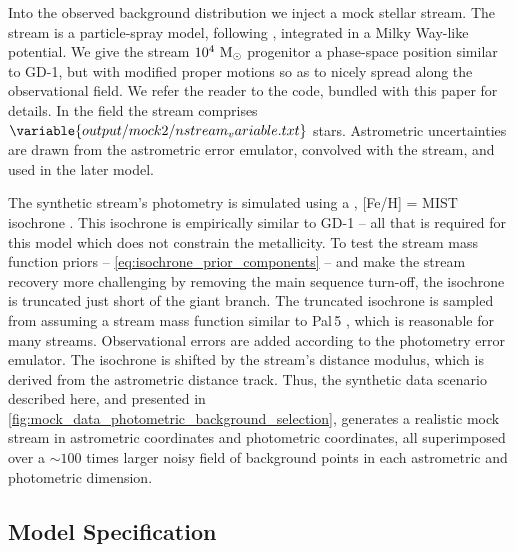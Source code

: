 \documentclass[twocolumn, linenumbers]{aastex631}
\newcommand{\stream}[1]{#1}
\begin{document}
        Into the observed background distribution we inject a mock stellar stream. The stream is a particle-spray model, following \cite{2015MNRAS.452..301F}, integrated in a Milky Way-like potential. We give the stream $10^4 \ \rm{M}_\odot$ progenitor a phase-space position similar to \stream{GD-1}, but with modified proper motions so as to nicely spread along the observational field. We refer the reader to the code, bundled with this paper for details. In the field the stream comprises $\variable{output/mock2/nstream_variable.txt}$ stars. Astrometric uncertainties are drawn from the astrometric error emulator, convolved with the stream, and used in the later model.
    
        The synthetic stream's photometry is simulated using a
        \unskip, [Fe/H] =
         MIST isochrone
        \citep[using][]{brutus}. This isochrone is empirically similar to \stream{GD-1} -- all that is required for this model which does not constrain the metallicity. To test the stream mass function priors -- \autoref{eq:isochrone_prior_components} -- and make the stream recovery more challenging by removing the main sequence turn-off, the isochrone is truncated just short of the
        giant branch. The truncated isochrone is sampled from assuming a stream mass function
        similar to \stream{Pal\,5} \citep{GrillmairSmith2001}, which is reasonable for many streams. Observational errors
        are added according to the photometry error emulator.
        The isochrone is shifted by the stream's distance modulus, which is
        derived from the astrometric distance track.
        Thus, the synthetic data scenario described here, and
        presented in \autoref{fig:mock_data_photometric_background_selection},
        generates a realistic mock stream in astrometric coordinates and photometric
        coordinates, all superimposed over a $\sim 100$ times larger noisy field of background points in each astrometric and photometric dimension. 


    \subsection{Model Specification} \label{sub:results_mock:model}
\end{document}
